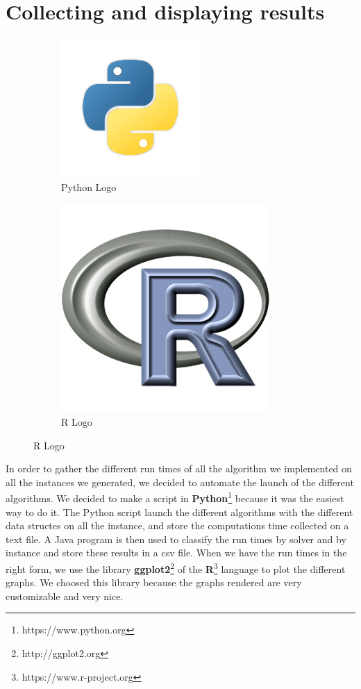 \section{Collecting and displaying results}


\begin{figure}
\centering
\begin{subfigure}{.5\textwidth}
  \centering
  \includegraphics[width=.4\linewidth]{images/pythonlogo.png}
  \caption{Python Logo}
  \label{fig:python}
\end{subfigure}%
\begin{subfigure}{.5\textwidth}
  \centering
  \includegraphics[width=.4\linewidth]{images/rlogo.jpg}
  \caption{R Logo}
  \label{fig:r}
\end{subfigure}
\label{fig:logos}
\end{figure}


In order to gather the different run times of all the algorithm we implemented on all the instances we generated, we decided to automate the launch of the different algorithms. We decided to make a script in \textbf{Python}\footnote{https://www.python.org} because it was the easiest way to do it. The Python script launch the different algorithms with the different data structes on all the instance, and store the computations time collected on a text file. A Java program is then used to classify the run times by solver and by instance and store these results in a csv file.
When we have the run times in the right form, we use the library \textbf{ggplot2}\footnote{http://ggplot2.org} of the \textbf{R}\footnote{https://www.r-project.org} language to plot the different graphs. We choosed this library because the graphs rendered are very customizable and  very nice.

